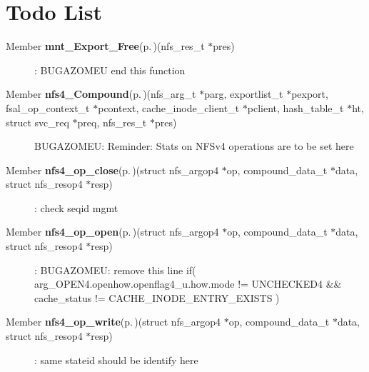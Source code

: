 \section{Todo List}\label{todo}
\label{todo__todo000001}
 \begin{description}
\item[Member {\bf mnt\_\-Export\_\-Free}{\rm (p.\,\pageref{mnt__Export_8c_a2})}(nfs\_\-res\_\-t $\ast$pres) ]: BUGAZOMEU end this function\end{description}


\label{todo__todo000002}
 \begin{description}
\item[Member {\bf nfs4\_\-Compound}{\rm (p.\,\pageref{nfs4__Compound_8c_a4})}(nfs\_\-arg\_\-t $\ast$parg, exportlist\_\-t $\ast$pexport, fsal\_\-op\_\-context\_\-t $\ast$pcontext, cache\_\-inode\_\-client\_\-t $\ast$pclient, hash\_\-table\_\-t $\ast$ht, struct svc\_\-req $\ast$preq, nfs\_\-res\_\-t $\ast$pres) ]BUGAZOMEU: Reminder: Stats on NFSv4 operations are to be set here\end{description}


\label{todo__todo000003}
 \begin{description}
\item[Member {\bf nfs4\_\-op\_\-close}{\rm (p.\,\pageref{nfs4__op__close_8c_a2})}(struct nfs\_\-argop4 $\ast$op, compound\_\-data\_\-t $\ast$data, struct nfs\_\-resop4 $\ast$resp) ]: check seqid mgmt\end{description}


\label{todo__todo000004}
 \begin{description}
\item[Member {\bf nfs4\_\-op\_\-open}{\rm (p.\,\pageref{nfs4__op__open_8c_a4})}(struct nfs\_\-argop4 $\ast$op, compound\_\-data\_\-t $\ast$data, struct nfs\_\-resop4 $\ast$resp) ]: BUGAZOMEU: remove this line if( arg\_\-OPEN4.openhow.openflag4\_\-u.how.mode != UNCHECKED4 \&\& cache\_\-status != CACHE\_\-INODE\_\-ENTRY\_\-EXISTS )\end{description}


\label{todo__todo000005}
 \begin{description}
\item[Member {\bf nfs4\_\-op\_\-write}{\rm (p.\,\pageref{nfs4__op__write_8c_a3})}(struct nfs\_\-argop4 $\ast$op, compound\_\-data\_\-t $\ast$data, struct nfs\_\-resop4 $\ast$resp) ]: same stateid should be identify here\end{description}


